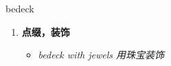 
\begin{frame}
{\huge bedeck}
\begin{center}
\begin{enumerate}\Large
  \item \textbf{点缀，装饰}
  \begin{itemize}
    \item \em{\Large{bedeck with jewels 用珠宝装饰}}
  \end{itemize}
\end{enumerate}
\end{center}
\end{frame}
